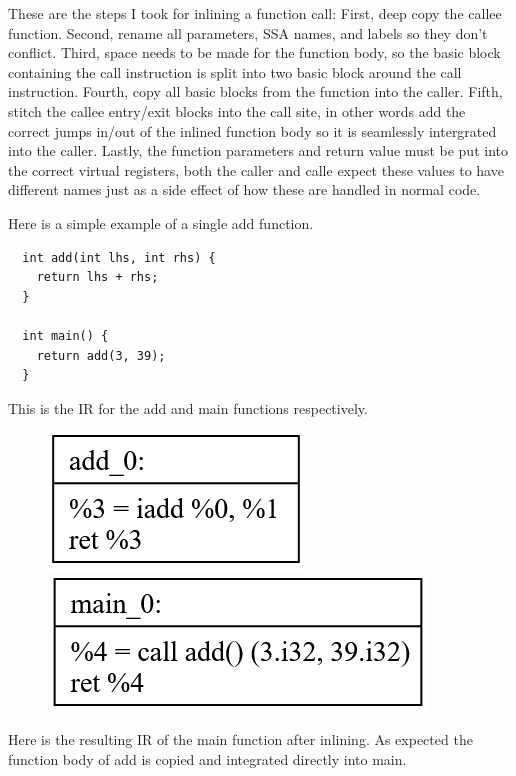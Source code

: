 \documentclass[11pt, a4paper, titlepage]{article}
\begin{document}
These are the steps I took for inlining a function call: First, deep copy the callee function. Second, rename all parameters, SSA names, and labels so they don't conflict. Third, space needs to be made for the function body, so the basic block containing the call instruction is split into two basic block around the call instruction. Fourth, copy all basic blocks from the function into the caller. Fifth, stitch the callee entry/exit blocks into the call site, in other words add the correct jumps in/out of the inlined function body so it is seamlessly intergrated into the caller. Lastly, the function parameters and return value must be put into the correct virtual registers, both the caller and calle expect these values to have different names just as a side effect of how these are handled in normal code.

Here is a simple example of a single add function.

\begin{lstlisting}
  int add(int lhs, int rhs) {
    return lhs + rhs;
  }
  
  int main() {
    return add(3, 39);
  }
\end{lstlisting}

This is the IR for the add and main functions respectively.

\begin{figure}[H]
  \centering
  \includegraphics[scale=0.3]{images/i27.png}
  \includegraphics[scale=0.3]{images/i28.png}
\end{figure}

Here is the resulting IR of the main function after inlining. As expected the function body of add is copied and integrated directly into main.
\end{document}
